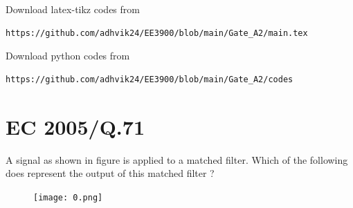 \documentclass[journal,12pt,twocolumn]{IEEEtran}
\begin{document}
Download latex-tikz codes from 
%
\begin{lstlisting}
https://github.com/adhvik24/EE3900/blob/main/Gate_A2/main.tex
\end{lstlisting}
%
Download python codes from 
%
\begin{lstlisting}
https://github.com/adhvik24/EE3900/blob/main/Gate_A2/codes
\end{lstlisting}
\section{EC 2005/Q.71}
A signal as shown in figure is applied to a matched filter. Which of the following
does represent the output of this matched filter ?
 \begin{figure}[!htp]
\centering
 \texttt{[image: 0.png]}
 \end{figure}
\end{document}
